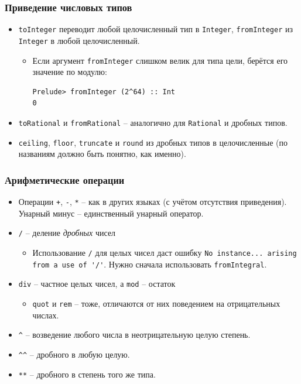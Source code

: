 \documentclass[10pt]{beamer}
\begin{document}
\begin{frame}[fragile]
\frametitle{Приведение числовых типов}
\begin{itemize}
    \item \lstinline|toInteger| переводит любой целочисленный тип в \lstinline|Integer|, \lstinline|fromInteger| из \lstinline|Integer| в любой целочисленный.
    \begin{itemize}
        \item Если аргумент \lstinline|fromInteger| слишком велик для типа цели, берётся его значение по модулю:
        \begin{lstlisting}
Prelude> fromInteger (2^64) :: Int
0
\end{lstlisting}
    \end{itemize}
    \item \lstinline|toRational| и \lstinline|fromRational| -- аналогично для \lstinline|Rational| и дробных типов.
    \item \lstinline|ceiling|, \lstinline|floor|, \lstinline|truncate| и \lstinline|round| из дробных типов в целочисленные (по названиям должно быть понятно, как именно).
\end{itemize}
\end{frame}

\begin{frame}[fragile]
\frametitle{Арифметические операции}
\begin{itemize}
    \item Операции \lstinline|+|, \lstinline|-|, \lstinline|*| -- как в других языках (с учётом отсутствия приведения).
    Унарный минус -- единственный унарный оператор.
    \item \lstinline|/| -- деление \emph{дробных} чисел
    \begin{itemize}
        \item Использование \lstinline|/| для целых чисел даст ошибку \lstinline|No instance... arising from a use of '/'|. Нужно сначала использовать \lstinline|fromIntegral|.
    \end{itemize}        
    \item \lstinline|div| -- частное целых чисел, а \lstinline|mod| -- остаток
    \begin{itemize}
        \item
 \lstinline|quot| и \lstinline|rem| -- тоже, отличаются от них поведением на отрицательных числах.
    \end{itemize}        
   \item \lstinline|^| -- возведение любого числа в неотрицательную  целую степень. 
       \item \lstinline|^^| -- дробного в любую целую. \item \lstinline|**| -- дробного в степень того же типа.
\end{itemize}
\end{frame}
\end{document}
